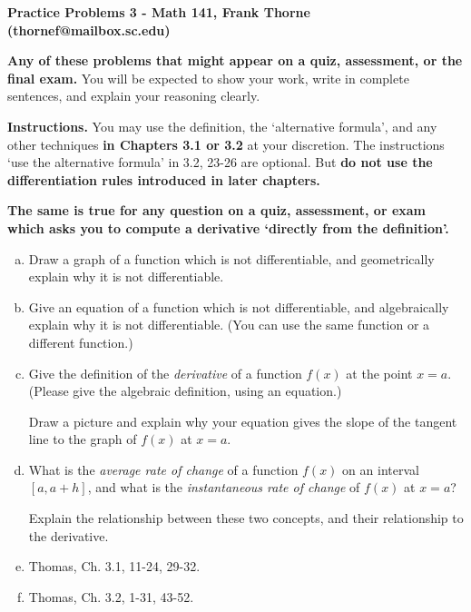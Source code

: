 \documentclass[11pt]{article}
\begin{document}
\setlength{\topmargin}{-2mm}





\begin{center}{\bf Practice Problems 3 - Math 141, Frank Thorne (thornef@mailbox.sc.edu)}
\end{center}

{\bf Any of these problems that might appear on a quiz, assessment, or the final exam.} You will be 
expected to show your work, write in complete sentences, and explain your reasoning clearly. 

\medskip
{\bf Instructions.} You may use the definition, the `alternative formula', and
any other techniques {\bf in Chapters 3.1 or 3.2} at your discretion. The instructions `use the alternative formula' in 3.2, 23-26 are optional.
But {\bf do not use the differentiation
rules introduced in later chapters.}

{\bf The same is true for any question on a quiz, assessment, or exam which asks you to compute a derivative `directly from the definition'.}

\begin{enumerate}[(a)]

\item
Draw a graph of a function which is not differentiable, and geometrically explain why it is not differentiable.

\item
Give an equation of a function which is not differentiable, and algebraically explain why it is not differentiable.
(You can use the same function or a different function.)

\item
Give the definition of the {\itshape derivative} of a function
$f(x)$ at the point $x = a$. (Please give the algebraic definition,
using an equation.)

Draw a picture and explain why your
equation gives the slope of the tangent line to the graph of $f(x)$
at $x = a$.

\item
What is the {\itshape average rate of change} of a function $f(x)$ on an interval $[a, a + h]$, and what is the {\itshape 
instantaneous rate of change} of $f(x)$ at $x = a$?

Explain the relationship between these two concepts, and their relationship to the derivative.

\item
Thomas, Ch. 3.1, 11-24, 29-32.

\item
Thomas, Ch. 3.2, 1-31, 43-52.

\end{enumerate}
\end{document}
